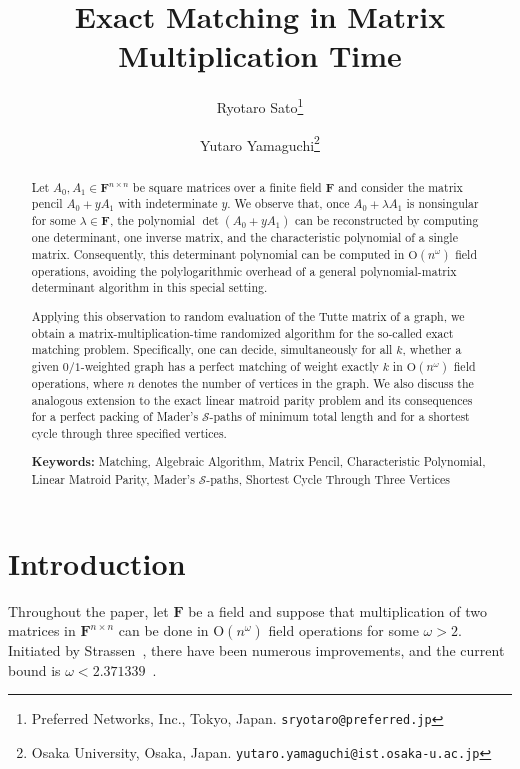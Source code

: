 \documentclass[11pt, a4paper]{article}
\title{Exact Matching in Matrix Multiplication Time}
\author{
Ryotaro Sato\thanks{Preferred Networks, Inc., Tokyo, Japan. \texttt{sryotaro@preferred.jp}} \and
Yutaro Yamaguchi\thanks{Osaka University, Osaka, Japan. \texttt{yutaro.yamaguchi@ist.osaka-u.ac.jp}}
}
\date{\empty}
\theoremstyle{plain}
\theoremstyle{definition}
\theoremstyle{remark}
\newcommand{\bF}{\mathbf{F}}
\begin{document}
\maketitle
\thispagestyle{empty}
\begin{abstract}
Let $A_0,A_1\in\bF^{n\times n}$ be square matrices over a finite field $\bF$ and consider the matrix pencil $A_0+yA_1$ with indeterminate $y$.
We observe that, once $A_0+\lambda A_1$ is nonsingular for some $\lambda\in\bF$, the polynomial $\det(A_0+yA_1)$ can be reconstructed by computing one determinant, one inverse matrix, and the characteristic polynomial of a single matrix.
Consequently, this determinant polynomial can be computed in $\mathrm{O}(n^\omega)$ field operations, avoiding the polylogarithmic overhead of a general polynomial-matrix determinant algorithm in this special setting.

Applying this observation to random evaluation of the Tutte matrix of a graph, we obtain a matrix-multiplication-time randomized algorithm for the so-called exact matching problem.
Specifically, one can decide, simultaneously for all $k$, whether a given $0/1$-weighted graph has a perfect matching of weight exactly $k$ in $\mathrm{O}(n^\omega)$ field operations, where $n$ denotes the number of vertices in the graph.
We also discuss the analogous extension to the exact linear matroid parity problem and its consequences for a perfect packing of Mader's $\mathcal{S}$-paths of minimum total length and for a shortest cycle through three specified vertices.

\bigskip
\noindent
\textbf{Keywords:} Matching, Algebraic Algorithm, Matrix Pencil, Characteristic Polynomial, Linear Matroid Parity, Mader's $\mathcal{S}$-paths, Shortest Cycle Through Three Vertices
\end{abstract}



\newpage
{}
\tableofcontents
\newpage
{}
\setcounter{page}{1}



\section{Introduction}
Throughout the paper, let $\bF$ be a field and suppose that multiplication of two matrices in $\bF^{n\times n}$ can be done in $\mathrm{O}(n^\omega)$ field operations for some $\omega>2$.
Initiated by Strassen~\cite{Strassen1969}, there have been numerous improvements, and the current bound is $\omega<2.371339$~\cite{ADWXXZ2025}.
\end{document}
